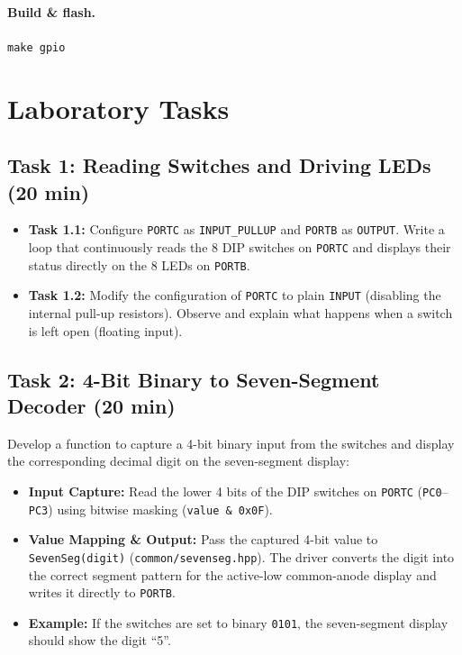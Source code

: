 \documentclass[11pt,a4paper]{article}
\begin{document}
\paragraph{Build \& flash.} \texttt{make gpio}



\newpage
\section{Laboratory Tasks}

\subsection*{Task 1: Reading Switches and Driving LEDs (20 min)}
\begin{itemize}
  \item \textbf{Task 1.1:} Configure \texttt{PORTC} as \texttt{INPUT\_PULLUP} and \texttt{PORTB} as \texttt{OUTPUT}. Write a loop that continuously reads the 8 DIP switches on \texttt{PORTC} and displays their status directly on the 8 LEDs on \texttt{PORTB}.
  \item \textbf{Task 1.2:} Modify the configuration of \texttt{PORTC} to plain \texttt{INPUT} (disabling the internal pull-up resistors). Observe and explain what happens when a switch is left open (floating input).
\end{itemize}

\subsection*{Task 2: 4-Bit Binary to Seven-Segment Decoder (20 min)}
Develop a function to capture a 4-bit binary input from the switches and display the corresponding decimal digit on the seven-segment display:
\begin{itemize}
  \item \textbf{Input Capture:} Read the lower 4 bits of the DIP switches on \texttt{PORTC} (\texttt{PC0}--\texttt{PC3}) using bitwise masking (\texttt{value \& 0x0F}).
  \item \textbf{Value Mapping \& Output:} Pass the captured 4-bit value to \texttt{SevenSeg(digit)} (\texttt{common/sevenseg.hpp}). The driver converts the digit into the correct segment pattern for the active-low common-anode display and writes it directly to \texttt{PORTB}.
  \item \textbf{Example:} If the switches are set to binary \texttt{0101}, the seven-segment display should show the digit ``5''.
\end{itemize}
\end{document}
